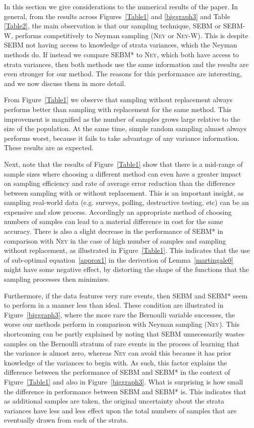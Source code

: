 \documentclass[]{interact}
\theoremstyle{plain}%
\theoremstyle{definition}
\theoremstyle{remark}
\begin{document}
In this section we give considerations to the numerical results of the paper.
In general, from the results across Figures~\ref{Table1} and \ref{biggraph3} and Table \ref{Table2}, the main observation is that our sampling technique, SEBM or SEBM-W, 
performs competitively to Neyman sampling (\textsc{Ney} or \textsc{Ney-W}).
This is despite SEBM not having access to knowledge of strata variances, which the Neyman methods do.
If instead we compare SEBM* to \textsc{Ney}, which both have access to strata variances, then both methods use the same information and the results are even stronger for our method. 
The reasons for this performance are interesting, 
and we now discuss them in more detail.

From Figure~\ref{Table1} we observe that sampling without replacement always performs better than sampling with replacement for the same method. 
This improvement is magnified as the number of samples grows large relative to the size of the population. 
At the same time, simple random sampling almost always performs worst, because it fails to take advantage of any variance information. These results are as expected.

Next, note that the results of Figure~\ref{Table1} show that there is a mid-range of sample sizes where choosing a different method can even have a greater impact on sampling efficiency and rate of average error reduction than the difference between sampling with or without replacement.
This is an important insight, as sampling real-world data (e.g. surveys, polling, destructive testing, etc) can be an expensive and slow process.
Accordingly an appropriate method of choosing numbers of samples can lead to a material difference in cost for the same accuracy.
There is also a slight decrease in the performance of SEBM* in comparison with \textsc{Ney} in the case of high number of samples and sampling without replacement, as illustrated in Figure~\ref{Table1}. 
This indicates that the use of sub-optimal equation~\ref{approx1} in the derivation of Lemma~\ref{martingale0} might have some negative effect, by distorting the shape of the functions that the sampling processes then minimizes.

Furthermore, if the data features very rare events, then SEBM and SEBM* seem to perform in a manner less than ideal.
These condition are illustrated in Figure~\ref{biggraph3}, where the more rare the Bernoulli variable successes, the worse our methods perform in comparison with Neyman sampling (\textsc{Ney}).
This shortcoming can be partly explained by noting that SEBM unnecessarily wastes samples on the Bernoulli stratum of rare events in the process of learning that the variance is almost zero, whereas \textsc{Ney} can avoid this because it has prior knowledge of the variances to begin with. 
As such, this factor explains the difference between the performance of SEBM and SEBM* in the context of Figure~\ref{Table1} and also in Figure~\ref{biggraph3}.
What is surprising is how small the difference in performance between SEBM and SEBM* is. 
This indicates that as additional samples are taken, the original uncertainty about the strata variances have less and less effect upon the total numbers of samples that are eventually drawn from each of the strata.
\end{document}
